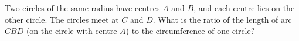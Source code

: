 Two circles of the same radius have centres $A$ and $B$, and each centre lies on the other circle. The circles meet at $C$ and $D$. What is the ratio of the length of arc $CBD$ (on the circle with centre $A$) to the circumference of one circle?
